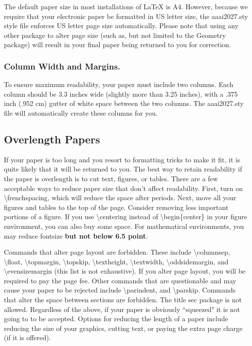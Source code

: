 The default paper size in most installations of \LaTeX{} is A4. However, because we require that your electronic paper be formatted in US letter size, the aaai2027.sty style file enforces US letter page size automatically. Please note that using any other package to alter page size (such as, but not limited to the Geometry package) will result in your final paper being returned to you for correction.


\subsubsection{Column Width and Margins.}
To ensure maximum readability, your paper must include two columns. Each column should be 3.3 inches wide (slightly more than 3.25 inches), with a .375 inch (.952 cm) gutter of white space between the two columns. The aaai2027.sty file will automatically create these columns for you.

\subsection{Overlength Papers}
If your paper is too long and you resort to formatting tricks to make it fit, it is quite likely that it will be returned to you. The best way to retain readability if the paper is overlength is to cut text, figures, or tables. There are a few acceptable ways to reduce paper size that don't affect readability. First, turn on \textbackslash frenchspacing, which will reduce the space after periods. Next, move all your figures and tables to the top of the page. Consider removing less important portions of a figure. If you use \textbackslash centering instead of \textbackslash begin\{center\} in your figure environment, you can also buy some space. For mathematical environments, you may reduce fontsize {\bf but not below 6.5 point}.


Commands that alter page layout are forbidden. These include \textbackslash columnsep,  \textbackslash float, \textbackslash topmargin, \textbackslash topskip, \textbackslash textheight, \textbackslash textwidth, \textbackslash oddsidemargin, and \textbackslash evensizemargin (this list is not exhaustive). If you alter page layout, you will be required to pay the page fee. Other commands that are questionable and may cause your paper to be rejected include \textbackslash parindent, and \textbackslash parskip. Commands that alter the space between sections are forbidden. The title sec package is not allowed. Regardless of the above, if your paper is obviously ``squeezed" it is not going to to be accepted. Options for reducing the length of a paper include reducing the size of your graphics, cutting text, or paying the extra page charge (if it is offered).


